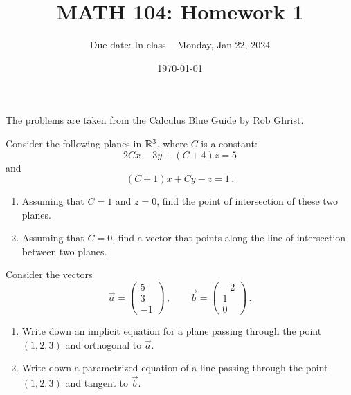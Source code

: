 \documentclass[12pt]{amsart}
\title{ MATH 104: Homework 1}
\author{Due date: In class -- Monday, Jan 22, 2024}
\date{\today}
\begin{document}
\maketitle

The problems are taken from the Calculus Blue Guide by Rob Ghrist.

\begin{problem}
    Consider the following planes in $\mathbb{R}^3$, where $C$ is a constant:
    \begin{equation*}
        2C x - 3y + (C + 4)z = 5 
    \end{equation*}
    and
    \begin{equation*}
        (C+1) x + C y - z = 1 \,.
    \end{equation*}
    \begin{enumerate}
        \item Assuming that $C = 1$ and $z = 0$, find the point
            of intersection of these two planes.
        \item Assuming that $C = 0$, find a vector that points
            along the line of intersection between two planes.
    \end{enumerate}
\end{problem}

\begin{problem}
    Consider the vectors
    \begin{equation*}
        \vec{a} = \begin{pmatrix}
            5 \\ 3 \\ -1
        \end{pmatrix}
        \,, \qquad 
        \vec{b} = \begin{pmatrix}
            -2 \\ 1 \\ 0
        \end{pmatrix} \,.
    \end{equation*}
    \begin{enumerate}
        \item Write down an implicit equation for a plane passing through 
            the point $(1,2,3)$ and orthogonal to $\vec{a}$.
        \item Write down a parametrized equation of a line passing through
            the point $(1,2,3)$ and tangent to $\vec{b}$.
    \end{enumerate}
\end{problem}
\end{document}
